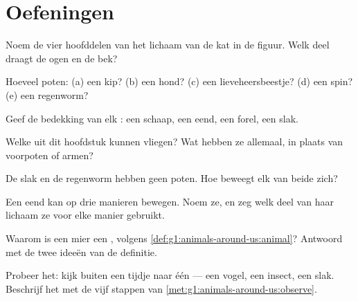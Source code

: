 \section{Oefeningen}

\begin{exercise}[$\star$]\label{exo:g1:animals-around-us:1}
Noem de vier hoofddelen van het lichaam van de kat in de figuur. Welk
deel draagt de ogen en de bek?
\end{exercise}

\begin{exercise}[$\star$]\label{exo:g1:animals-around-us:2}
Hoeveel poten: (a) een kip? (b) een hond? (c) een lieveheersbeestje?
(d) een spin? (e) een regenworm?
\end{exercise}

\begin{exercise}[$\star$]\label{exo:g1:animals-around-us:3}
Geef de bedekking van elk : een schaap, een eend, een forel, een
slak.
\end{exercise}

\begin{exercise}[$\star$]\label{exo:g1:animals-around-us:4}
Welke  uit dit hoofdstuk kunnen vliegen? Wat hebben ze allemaal,
in plaats van voorpoten of armen?
\end{exercise}

\begin{exercise}[$\star$]\label{exo:g1:animals-around-us:5}
De slak en de regenworm hebben geen poten. Hoe beweegt elk van beide
zich?
\end{exercise}

\begin{exercise}[$\star$]\label{exo:g1:animals-around-us:6}
Een eend kan op drie manieren bewegen. Noem ze, en zeg welk deel van
haar lichaam ze voor elke manier gebruikt.
\end{exercise}

\begin{exercise}[$\star$]\label{exo:g1:animals-around-us:7}
Waarom is een mier een , volgens \cref{def:g1:animals-around-us:animal}?
Antwoord met de twee ideeën van de definitie.
\end{exercise}

\begin{exercise}[$\star$]\label{exo:g1:animals-around-us:8}
Probeer het: kijk buiten een tijdje naar één  --- een vogel, een
insect, een slak. Beschrijf het met de vijf stappen van
\cref{met:g1:animals-around-us:observe}.
\end{exercise}

